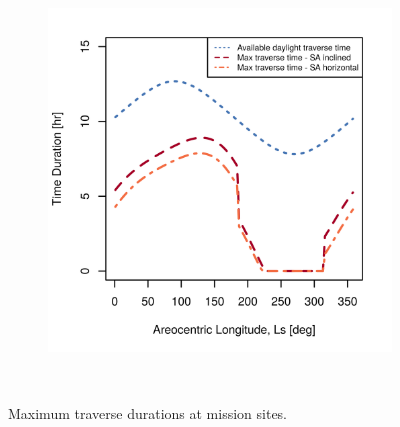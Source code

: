 \begin{figure}[h]
\begin{subfigure}[t]{\subfigureWidth}
        \includegraphics[height=\graphicsHeight]{sections/design/solar-array/plots/ismeniuscavus-75w-max-traverse-durations-for-solar-cell-coverage-area-24m2.png}
		\label{fig:plot:sub:final-maximum-traverse-durations-ismenius-cavus}
	\end{subfigure}\\[0.8ex]
    \caption[Maximum traverse durations at mission sites]
            {Maximum traverse durations at mission sites.}
    \label{fig:plot:final-maximum-traverse-durations-at-missions-sites}
\vspace{-2ex}
\end{figure}



\clearpage
